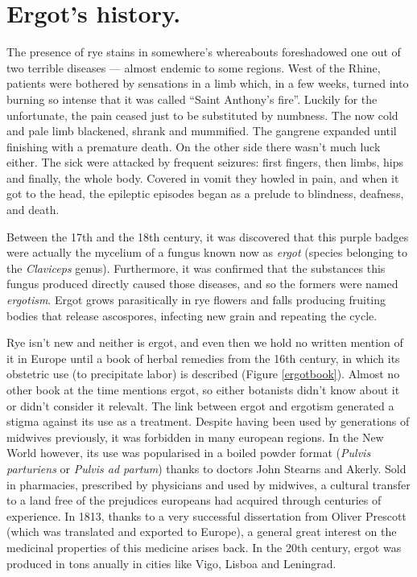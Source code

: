 \section{Ergot's history.}

The presence of rye stains in somewhere's whereabouts foreshadowed one out of two terrible diseases --- almost endemic to some regions. West of the Rhine, patients were bothered by sensations in a limb which, in a few weeks, turned into burning so intense that it was called \enquote{Saint Anthony's fire}. Luckily for the unfortunate, the pain ceased just to be substituted by numbness. The now cold and pale limb blackened, shrank and mummified. The gangrene expanded until finishing with a premature death. On the other side there wasn't much luck either. The sick were attacked by frequent seizures: first fingers, then limbs, hips and finally, the whole body. Covered in vomit they howled in pain, and when it got to the head, the epileptic episodes began as a prelude to blindness, deafness, and death.

Between the 17th and the 18th century, it was discovered that this purple badges were actually the mycelium of a fungus known now as \textit{ergot} (species belonging to the \textit{Claviceps} genus). Furthermore, it was confirmed that the substances this fungus produced directly caused those diseases, and so the formers were named \textit{ergotism}. Ergot grows parasitically in rye flowers and falls producing fruiting bodies that release ascospores, infecting new grain and repeating the cycle.

Rye isn't new and neither is ergot, and even then we hold no written mention of it in Europe until a book of herbal remedies from the 16th century, in which its obstetric use (to precipitate labor) is described (Figure \ref{ergotbook}). Almost no other book at the time mentions ergot, so either botanists didn't know about it or didn't consider it relevalt. The link between ergot and ergotism generated a stigma against its use as a treatment. Despite having been used by generations of midwives previously, it was forbidden in many european regions. In the New World however, its use was popularised in a boiled powder format (\textit{Pulvis parturiens} or \textit{Pulvis ad partum}) thanks to doctors John Stearns and Akerly. Sold in pharmacies, prescribed by physicians and used by midwives, a cultural transfer to a land free of the prejudices europeans had acquired through centuries of experience. In 1813, thanks to a very successful dissertation from Oliver Prescott (which was translated and exported to Europe), a general great interest on the medicinal properties of this medicine arises back. In the 20th century, ergot was produced in tons anually in cities like Vigo, Lisboa and Leningrad. 

